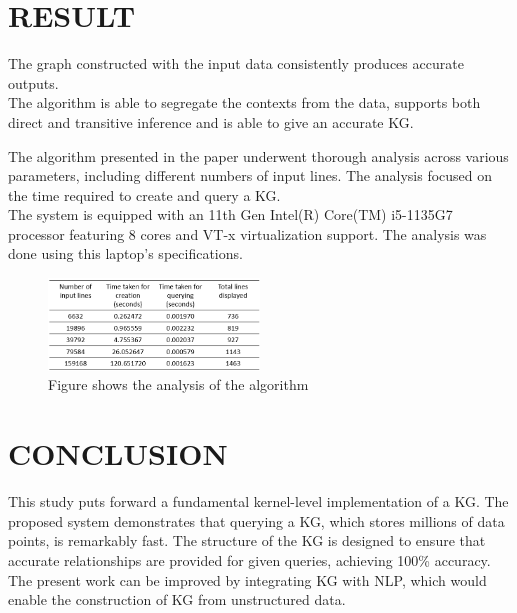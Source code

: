 \documentclass[conference]{IEEEtran}
\begin{document}
\section{RESULT}
The graph constructed with the input data consistently produces accurate outputs.\\
The algorithm is able to segregate the contexts from the data, supports both direct and transitive inference and is able to give an accurate KG.

The algorithm presented in the paper underwent thorough analysis across various parameters, including different numbers of input lines. The analysis focused on the time required to create and query a KG.\\
The system is equipped with an 11th Gen Intel(R) Core(TM) i5-1135G7 processor featuring 8 cores and VT-x virtualization support. The analysis was done using this laptop's specifications.


\begin{figure}[htbp]
\centerline{\includegraphics[width=0.5\textwidth]{result_table.png}}
\caption{Figure shows the analysis of the algorithm}
\label{fig}
\end{figure}


\section{CONCLUSION}
This study puts forward a fundamental kernel-level implementation of a KG. 
The proposed system demonstrates that querying a KG, which stores millions of data points, is remarkably fast. 
The structure of the KG is designed to ensure that accurate relationships are provided for given queries, achieving 100\% accuracy.
\\
The present work can be improved by integrating KG with NLP, which would enable the construction of KG from unstructured data.
\end{document}
